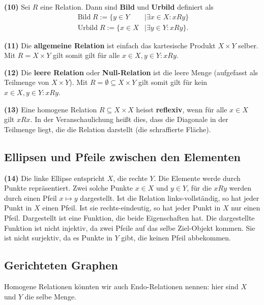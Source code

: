 \documentclass[a4paper]{amsart}
\theoremstyle{definition}
\DeclareMathOperator{\Bild}{Bild}
\DeclareMathOperator{\Urbild}{Urbild}
\begin{document}
\textbf{(10)} Sei $R$ eine Relation. Dann sind \textbf{Bild} und \textbf{Urbild} definiert als
\begin{align}
   \Bild R := \{ y \in Y &| \exists x \in X \colon xRy\}\\
   \Urbild R := \{ x \in X &| \exists y \in Y \colon xRy\}.
\end{align}

\textbf{(11)} Die \textbf{allgemeine Relation} ist einfach das kartesische Produkt $X \times Y$ selber.
Mit $R = X \times Y$ gilt somit gilt für alle $x \in X, y \in Y \colon xRy$.

\textbf{(12)} Die \textbf{leere Relation} oder \textbf{Null-Relation} ist die leere Menge (aufgefasst als Teilmenge von $X \times Y$).
Mit $R = \emptyset \subseteq X \times Y$ gilt somit gilt für kein $x \in X, y \in Y \colon xRy$.

\textbf{(13)} Eine homogene Relation $R \subseteq X \times X$ heisst \textbf{reflexiv}, wenn für alle $x\in X$ gilt $xRx$. In der Veranschaulichung heißt dies, dass die Diagonale in der Teilmenge liegt, die die Relation darstellt (die schraffierte Fläche).

\subsection{Ellipsen und Pfeile zwischen den Elementen}
\textbf{(14)} Die linke Ellipse entspricht $X$, die rechte $Y$. Die Elemente werde durch Punkte repräsentiert. Zwei solche Punkte $x \in X$ und $y \in Y$, für die $xRy$ werden durch einen Pfeil $x \mapsto y$ dargestellt. Ist die Relation links-vollständig, so hat jeder Punkt in $X$ einen Pfeil. Ist sie rechts-eindeutig, so hat jeder Punkt in $X$ nur einen Pfeil. Dargestellt ist eine Funktion, die beide Eigenschaften hat. Die dargestellte Funktion ist nicht injektiv, da zwei Pfeile auf das selbe Ziel-Objekt kommen. Sie ist nicht surjektiv, da es Punkte in $Y$ gibt, die keinen Pfeil abbekommen.
 
\subsection{Gerichteten Graphen}
Homogene Relationen könnten wir auch Endo-Relationen nennen: hier sind $X$ und $Y$ die selbe Menge.
\end{document}
